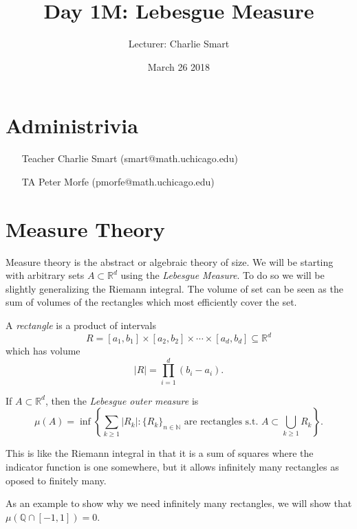\documentclass{amsart}
\title{Day 1M: Lebesgue Measure}
\date{March 26 2018}
\author{Lecturer: Charlie Smart}
\newcommand{\braces}[1]{\left\{ #1\right\}}
\theoremstyle{definition}
\numberwithin{equation}{section}
\newcommand{\s}[1]{\{#1\}}
\newcommand{\SET}[1]{\braces{#1}}
\newcommand{\N}{\mathbb{N}}
\newcommand{\R}{\mathbb{R}}
\newcommand{\Q}{\mathbb{Q}}
\begin{document}
  \maketitle

  \section*{Administrivia}

  \begin{enumerate}
    \item[Teacher] Charlie Smart (smart@math.uchicago.edu)
    \item[TA] Peter Morfe (pmorfe@math.uchicago.edu)
  \end{enumerate}

  \section*{Measure Theory}
  Measure theory is the abstract or algebraic theory of size. We will be starting with arbitrary sets $A \subset \R^d$ using the \emph{Lebesgue Measure}. To do so we will be slightly generalizing the Riemann integral. The volume of set can be seen as the sum of volumes of the rectangles which most efficiently cover the set.

  \begin{definition}

    A \emph{rectangle} is a product of intervals
    \[R = [a_1, b_1] \times [a_2, b_2] \times \cdots \times [a_d, b_d] \subseteq \R^d\]
    which has volume
    \[|R| = \prod_{i=1}^d (b_i - a_i).\]

  \end{definition}

  \begin{definition}

    If $A \subset \R^d$, then the \emph{Lebesgue outer measure} is
    \[\mu(A) = \inf \SET{\sum_{k \geq 1}|R_k| : \s{R_k}_{n\in\N} \text{ are rectangles s.t. } A \subset \bigcup_{k\geq1}R_k}.\]

    This is like the Riemann integral in that it is a sum of squares where the indicator function is one somewhere, but it allows infinitely many rectangles as oposed to finitely many.

  \end{definition}

  \begin{example}

    As an example to show why we need infinitely many rectangles, we will show that $\mu(\Q \cap [-1, 1]) = 0$.

  \end{example}
\end{document}
